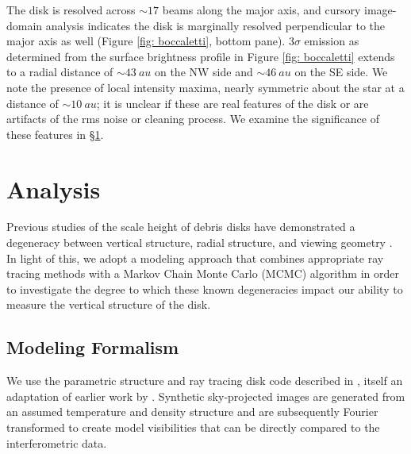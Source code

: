 \documentclass[12pt,oneside]{book}
\begin{document}
The disk is resolved across $\sim 17$ beams along the major axis, and cursory image-domain analysis indicates the disk is marginally resolved perpendicular to the major axis as well (Figure \ref{fig: boccaletti}, bottom pane).
$3\sigma$ emission as determined from the surface brightness profile in Figure \ref{fig: boccaletti} extends to a radial distance of $\sim \SI{43}{au}$ on the NW side and $\sim \SI{46}{au}$ on the SE side. 
We note the presence of local intensity maxima, nearly symmetric about the star at a distance of $\sim \SI{10}{au}$; it is unclear if these are real features of the disk or are artifacts of the rms noise or cleaning process. 
We examine the significance of these features in \S \ref{chapter: analysis}.


\clearpage
\chapter{Analysis}
\label{chapter: analysis}
Previous studies of the scale height of debris disks have demonstrated a degeneracy between vertical structure, radial structure, and viewing geometry \citep[e.g.,][]{milli14}.  
In light of this, we adopt a modeling approach that combines appropriate ray tracing methods with a Markov Chain Monte Carlo (MCMC) algorithm in order to investigate the degree to which these known degeneracies impact our ability to measure the vertical structure of the disk.  

\section{Modeling Formalism}

We use the parametric structure and ray tracing disk code described in \cite{flaherty15}, itself an adaptation of earlier work by \cite{rosenfeld13}.
Synthetic sky-projected images are generated from an assumed temperature and density structure and are subsequently Fourier transformed to create model visibilities that can be directly compared to the interferometric data.
\end{document}
